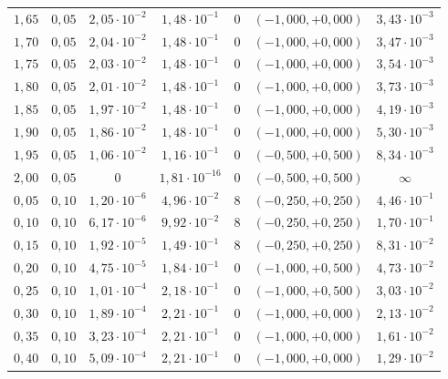 \begin{tabular}{ccccccc}
$1{,}65$ & $0{,}05$ & $2{,}05 \cdot 10^{-2}$ & $1{,}48 \cdot 10^{-1}$ & 0 & $(-1{,}000, +0{,}000)$ & $3{,}43 \cdot 10^{-3}$ \\
$1{,}70$ & $0{,}05$ & $2{,}04 \cdot 10^{-2}$ & $1{,}48 \cdot 10^{-1}$ & 0 & $(-1{,}000, +0{,}000)$ & $3{,}47 \cdot 10^{-3}$ \\
$1{,}75$ & $0{,}05$ & $2{,}03 \cdot 10^{-2}$ & $1{,}48 \cdot 10^{-1}$ & 0 & $(-1{,}000, +0{,}000)$ & $3{,}54 \cdot 10^{-3}$ \\
$1{,}80$ & $0{,}05$ & $2{,}01 \cdot 10^{-2}$ & $1{,}48 \cdot 10^{-1}$ & 0 & $(-1{,}000, +0{,}000)$ & $3{,}73 \cdot 10^{-3}$ \\
$1{,}85$ & $0{,}05$ & $1{,}97 \cdot 10^{-2}$ & $1{,}48 \cdot 10^{-1}$ & 0 & $(-1{,}000, +0{,}000)$ & $4{,}19 \cdot 10^{-3}$ \\
$1{,}90$ & $0{,}05$ & $1{,}86 \cdot 10^{-2}$ & $1{,}48 \cdot 10^{-1}$ & 0 & $(-1{,}000, +0{,}000)$ & $5{,}30 \cdot 10^{-3}$ \\
$1{,}95$ & $0{,}05$ & $1{,}06 \cdot 10^{-2}$ & $1{,}16 \cdot 10^{-1}$ & 0 & $(-0{,}500, +0{,}500)$ & $8{,}34 \cdot 10^{-3}$ \\
$2{,}00$ & $0{,}05$ & $0$ & $1{,}81 \cdot 10^{-16}$ & 0 & $(-0{,}500, +0{,}500)$ & $\infty$ \\
$0{,}05$ & $0{,}10$ & $1{,}20 \cdot 10^{-6}$ & $4{,}96 \cdot 10^{-2}$ & 8 & $(-0{,}250, +0{,}250)$ & $4{,}46 \cdot 10^{-1}$ \\
$0{,}10$ & $0{,}10$ & $6{,}17 \cdot 10^{-6}$ & $9{,}92 \cdot 10^{-2}$ & 8 & $(-0{,}250, +0{,}250)$ & $1{,}70 \cdot 10^{-1}$ \\
$0{,}15$ & $0{,}10$ & $1{,}92 \cdot 10^{-5}$ & $1{,}49 \cdot 10^{-1}$ & 8 & $(-0{,}250, +0{,}250)$ & $8{,}31 \cdot 10^{-2}$ \\
$0{,}20$ & $0{,}10$ & $4{,}75 \cdot 10^{-5}$ & $1{,}84 \cdot 10^{-1}$ & 0 & $(-1{,}000, +0{,}500)$ & $4{,}73 \cdot 10^{-2}$ \\
$0{,}25$ & $0{,}10$ & $1{,}01 \cdot 10^{-4}$ & $2{,}18 \cdot 10^{-1}$ & 0 & $(-1{,}000, +0{,}500)$ & $3{,}03 \cdot 10^{-2}$ \\
$0{,}30$ & $0{,}10$ & $1{,}89 \cdot 10^{-4}$ & $2{,}21 \cdot 10^{-1}$ & 0 & $(-1{,}000, +0{,}000)$ & $2{,}13 \cdot 10^{-2}$ \\
$0{,}35$ & $0{,}10$ & $3{,}23 \cdot 10^{-4}$ & $2{,}21 \cdot 10^{-1}$ & 0 & $(-1{,}000, +0{,}000)$ & $1{,}61 \cdot 10^{-2}$ \\
$0{,}40$ & $0{,}10$ & $5{,}09 \cdot 10^{-4}$ & $2{,}21 \cdot 10^{-1}$ & 0 & $(-1{,}000, +0{,}000)$ & $1{,}29 \cdot 10^{-2}$ \\

\end{tabular}
